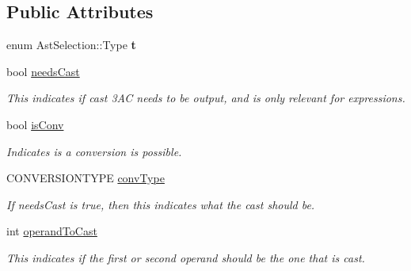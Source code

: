 \subsection*{Public Attributes}
\begin{DoxyCompactItemize}
\item 
\hypertarget{classAstSelection_a638d589f77696ed1d0df98aaa0e50835}{enum Ast\-Selection\-::\-Type {\bfseries t}}\label{classAstSelection_a638d589f77696ed1d0df98aaa0e50835}

\item 
\hypertarget{classAST_aaf215802de409f8096c063d01ffa6783}{bool \hyperlink{classAST_aaf215802de409f8096c063d01ffa6783}{needs\-Cast}}\label{classAST_aaf215802de409f8096c063d01ffa6783}

\begin{DoxyCompactList}\small\item\em This indicates if cast 3\-A\-C needs to be output, and is only relevant for expressions. \end{DoxyCompactList}\item 
\hypertarget{classAST_afa9e77ef650ec6664458fa6cb55be985}{bool \hyperlink{classAST_afa9e77ef650ec6664458fa6cb55be985}{is\-Conv}}\label{classAST_afa9e77ef650ec6664458fa6cb55be985}

\begin{DoxyCompactList}\small\item\em Indicates is a conversion is possible. \end{DoxyCompactList}\item 
\hypertarget{classAST_a61ef3317e023d45237e06615b387cd6b}{C\-O\-N\-V\-E\-R\-S\-I\-O\-N\-T\-Y\-P\-E \hyperlink{classAST_a61ef3317e023d45237e06615b387cd6b}{conv\-Type}}\label{classAST_a61ef3317e023d45237e06615b387cd6b}

\begin{DoxyCompactList}\small\item\em If needs\-Cast is true, then this indicates what the cast should be. \end{DoxyCompactList}\item 
\hypertarget{classAST_aea9b07b39d24183f38c0029cec0a878e}{int \hyperlink{classAST_aea9b07b39d24183f38c0029cec0a878e}{operand\-To\-Cast}}\label{classAST_aea9b07b39d24183f38c0029cec0a878e}

\begin{DoxyCompactList}\small\item\em This indicates if the first or second operand should be the one that is cast. \end{DoxyCompactList}\end{DoxyCompactItemize}
